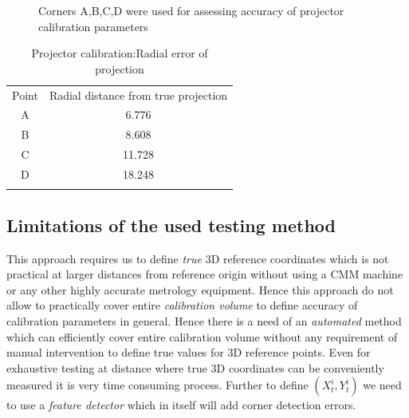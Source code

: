 \begin{enumerate}
\begin{figure}
\caption{Corners A,B,C,D were used for assessing accuracy of projector calibration parameters}
\label{fig:proj_calib_accuracy}
\end{figure}

\begin{table}[ht]
\centering
\begin{tabular}{c c}
\hline\noalign{\smallskip}
Point  & Radial distance from true projection \\
\noalign{\smallskip}\hline\noalign{\smallskip}
A   &  6.776 \\
B   &  8.608 \\
C   &  11.728\\
D   &  18.248\\
\noalign{\smallskip}\hline
\end{tabular}
\caption{Projector calibration:Radial error of projection}
\end{table}
\end{enumerate}

\subsection{Limitations of the used testing method}
This approach requires us to define \textit{true} 3D reference coordinates which is not practical at larger distances from reference origin without using a CMM machine or any other highly accurate metrology equipment. Hence this approach do not allow to practically cover entire \textit{calibration volume} to define accuracy of calibration parameters in general. Hence there is a need of an \textit{automated} method which can efficiently cover entire calibration volume without any requirement of manual intervention to define true values for 3D reference points. Even for exhaustive testing at distance where true 3D coordinates can be conveniently measured it is very time consuming process. Further to define $(X_t^i,Y_t^i)$ we need to use a \textit{feature detector} which in itself will add corner detection errors.  



